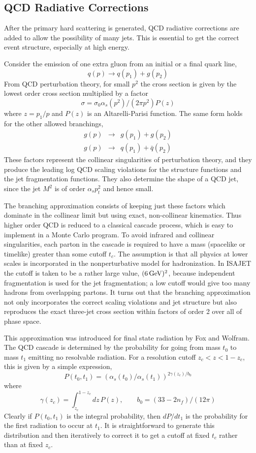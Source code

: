 \subsection{QCD Radiative Corrections\label{qcdshower}}

      After the primary hard scattering is generated, QCD radiative
corrections are added to allow the possibility of many jets. This is
essential to get the correct event structure, especially at high
energy.

      Consider the emission of one extra gluon from an initial or a
final quark line,
$$
q(p) \to q(p_1) + g(p_2)
$$
From QCD perturbation theory, for small $p^2$ the cross section is
given by the lowest order cross section multiplied by a factor
$$
\sigma = \sigma_0  \alpha_s(p^2)/(2\pi p^2) P(z)
$$
where $z=p_1/p$ and $P(z)$ is an Altarelli-Parisi function. The same
form holds for the other allowed branchings,
\begin{eqnarray*}
g(p) &\to& g(p_1) + g(p_2) \\
g(p) &\to& q(p_1) + \bar q(p_2)
\end{eqnarray*}
These factors represent the collinear singularities of perturbation
theory, and they produce the leading log QCD scaling violations for the
structure functions and the jet fragmentation functions. They also
determine the shape of a QCD jet, since the jet $M^2$ is of order
$\alpha_s p_t^2$ and hence small.

      The branching approximation consists of keeping just these
factors which dominate in the collinear limit but using exact,
non-collinear kinematics. Thus higher order QCD is reduced to a
classical cascade process, which is easy to implement in a Monte Carlo
program. To avoid infrared and collinear singularities, each parton in
the cascade is required to have a mass (spacelike or timelike) greater
than some cutoff $t_c$. The assumption is that all physics at lower
scales is incorporated in the nonperturbative model for hadronization.
In ISAJET the cutoff is taken to be a rather large value,
$(6\,{\rm GeV})^2$, because independent fragmentation is used for the jet 
fragmentation; a low cutoff would give too many hadrons from
overlapping partons. It turns out that the branching approximation not
only incorporates the correct scaling violations and jet structure but
also reproduces the exact three-jet cross section within factors of
order 2 over all of phase space.

      This approximation was introduced for final state radiation by
Fox and Wolfram. The QCD cascade is determined by the probability for
going from mass $t_0$ to mass $t_1$ emitting no resolvable radiation.
For a resolution cutoff $z_c < z < 1-z_c$, this is given by a simple
expression,
$$      
P(t_0,t_1)=\left(\alpha_s(t_0)/\alpha_s(t_1)\right)^{2\gamma(z_c)/b_0}
$$
where
$$
\gamma(z_c)=\int_{z_c}^{1-z_c} dz\,P(z),\qquad
b_0=(33-2n_f)/(12\pi)
$$
Clearly if $P(t_0,t_1)$ is the integral probability, then $dP/dt_1$ is
the probability for the first radiation to occur at $t_1$. It is
straightforward to generate this distribution and then iteratively to
correct it to get a cutoff at fixed $t_c$ rather than at fixed $z_c$.

